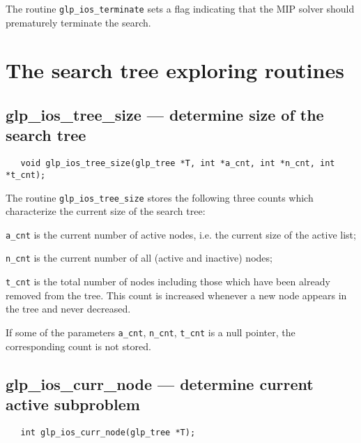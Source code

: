 \description

The routine \verb|glp_ios_terminate| sets a flag indicating that the
MIP solver should prematurely terminate the search.


\newpage

\section{The search tree exploring routines}

\subsection{glp\_ios\_tree\_size --- determine size of the search tree}

\synopsis

\begin{verbatim}
   void glp_ios_tree_size(glp_tree *T, int *a_cnt, int *n_cnt, int *t_cnt);
\end{verbatim}

\description

The routine \verb|glp_ios_tree_size| stores the following three counts
which characterize the current size of the search tree:

\verb|a_cnt| is the current number of active nodes, i.e. the current
size of the active list;

\verb|n_cnt| is the current number of all (active and inactive) nodes;

\verb|t_cnt| is the total number of nodes including those which have
been already removed from the tree. This count is increased whenever
a new node appears in the tree and never decreased.

If some of the parameters \verb|a_cnt|, \verb|n_cnt|, \verb|t_cnt| is
a null pointer, the corresponding count is not stored.

\subsection{glp\_ios\_curr\_node --- determine current active
subproblem}

\synopsis

\begin{verbatim}
   int glp_ios_curr_node(glp_tree *T);
\end{verbatim}

\returns


